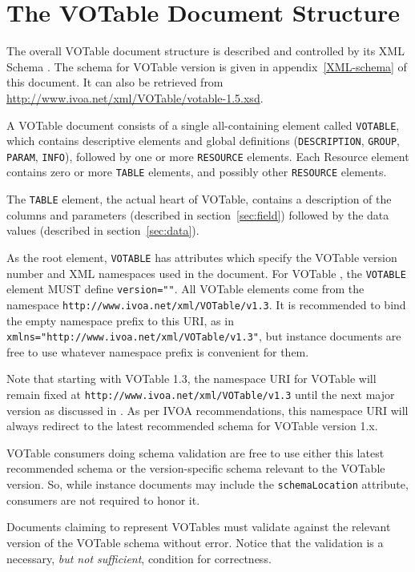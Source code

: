 \documentclass[11pt,a4paper]{ivoa}
\def\Aref#1{section~\ref{#1}}
\def\Arefx#1{appendix~\ref{#1}}
\let\fg=\color
\def\attr#1{{\tt{\fg{DarkRed}#1}}}
\def\elem#1{{\tt{\fg{DarkRed}#1}}}
\def\attrval#1#2{{\tt{\fg{DarkRed}#1}="{\fg{DarkPurple}#2}"}}
\begin{document}
\section{The VOTable Document Structure}
\label{elem:VOTABLE}

The overall VOTable document structure is described and controlled
by its XML Schema \citep{std:XSD}.  The schema for VOTable version \ivoaDocversion{} is
given in \Arefx{XML-schema} of this document.  It can also
be retrieved from \url{http://www.ivoa.net/xml/VOTable/votable-1.5.xsd}.

A VOTable document consists of a single all-containing element
called {\elem{VOTABLE}}, which contains descriptive elements and global definitions
({\elem{DESCRIPTION}}, \elem{GROUP}, \elem{PARAM}, \elem{INFO}),
followed by one or more {\elem{RESOURCE}} elements.
Each Resource element contains zero or more \elem{TABLE} elements,
and possibly other \elem{RESOURCE} elements.

The \elem{TABLE} element, the actual heart of VOTable, contains
a description of the columns and parameters
(described in \Aref{sec:field})
followed by the data values
(described in \Aref{sec:data}).

As the root element, \elem{VOTABLE} has attributes which specify the VOTable version
number and XML namespaces used in the document. For VOTable \ivoaDocversion{}, the \elem{VOTABLE}
element MUST define \attrval{version}{\ivoaDocversion{}}.  All VOTable \ivoaDocversion{} elements come from the
namespace \nolinkurl{http://www.ivoa.net/xml/VOTable/v1.3}.  It is recommended to bind
the empty namespace prefix to this URI, as in
\attrval{xmlns}{http://www.ivoa.net/xml/VOTable/v1.3}, but instance
documents are free to use whatever namespace prefix is convenient for them.

Note that starting with VOTable 1.3, the namespace URI for VOTable will
remain fixed at \nolinkurl{http://www.ivoa.net/xml/VOTable/v1.3}
until the next major version as discussed in \citet{2018ivoa.spec.0529H}.
As per IVOA
recommendations, this namespace URI will always redirect to the latest
recommended schema for VOTable version 1.x.

VOTable consumers doing schema validation
are free to use either this latest recommended schema or the version-specific
schema relevant to the VOTable version. So, while instance documents
may include the \attr{schemaLocation} attribute, consumers are not required
to honor it.

Documents claiming to represent VOTables must validate against the
relevant version of the VOTable schema without error.  Notice that the
validation is a necessary, {\em but not sufficient}, condition for correctness.
\end{document}
